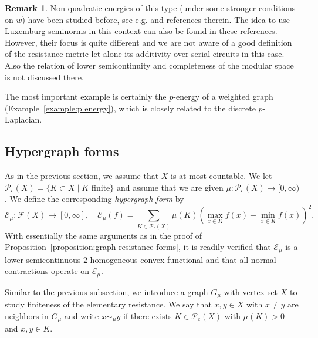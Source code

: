 \documentclass[a4paper,11pt,reqno]{amsart}
\theoremstyle{definition}
\newtheorem{example}[lemma]{Example}
\newtheorem{remark}[lemma]{Remark}
\numberwithin{equation}{section}
\newcommand{\cE}{{\mathcal E}}
\newcommand{\cF}{{\mathcal F}}
\newcommand{\1}{\mathds{1}}
\begin{document}
\begin{remark}
 Non-quadratic energies of this type (under some stronger conditions on $w$) have been studied before, see e.g. \cite{Soa93,Soa93a,Soa94,LS96,Kas16,Kas20} and references therein. The idea to use Luxemburg seminorms in this context can also be found in these references.  However, their focus is quite different and we are not aware of a good definition of the resistance metric let alone its additivity over serial circuits in this case. Also the relation of lower semicontinuity and completeness of the modular space is not discussed there.  
 
 The most important example is certainly the $p$-energy of a weighted graph (Example~\ref{example:p energy}), which is closely related to the discrete $p$-Laplacian.
\end{remark}





\subsection{Hypergraph forms}

As in the previous section, we assume that $X$ is at most countable. We let  $\mathcal P_c(X) =  \{K \subset X \mid K \text{ finite}\}$  and assume that we are given $\mu  \colon \mathcal P_c(X) \to [0,\infty)$. We define the corresponding {\em hypergraph form} by 
%
$$\cE_\mu \colon \cF(X) \to [0,\infty], \quad \cE_\mu(f) = \sum_{K \in \mathcal P_c(X)} \mu(K) (\max_{x \in K} f(x) - \min_{x \in K} f(x))^2.$$
%
With essentially the same arguments as in the proof of Proposition~\ref{proposition:graph resistance forms}, it is readily verified that $\cE_\mu$ is a lower semicontinuous $2$-homogeneous convex functional and that all normal contractions operate on $\cE_\mu$.  

Similar to the previous subsection, we introduce a graph $G_\mu$ with vertex set $X$ to study finiteness of the elementary resistance. We say that $x,y \in X$ with $x \neq y$ are neighbors in $G_\mu$ and write $x \sim_\mu y$ if there exists $K \in \mathcal P_c(X)$ with $\mu(K) > 0$ and $x,y \in K$. 
\end{document}

